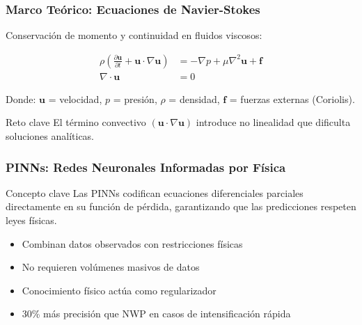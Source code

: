 \begin{frame}[fragile]
  \frametitle{Marco Teórico: Ecuaciones de Navier-Stokes}
  
  Conservación de momento y continuidad en fluidos viscosos:
  
  \begin{align*}
    \rho \left( \frac{\partial \mathbf{u}}{\partial t} + \mathbf{u} \cdot \nabla \mathbf{u} \right) &= -\nabla p + \mu \nabla^2 \mathbf{u} + \mathbf{f} \\
    \nabla \cdot \mathbf{u} &= 0
  \end{align*}
  
  Donde: $\mathbf{u}$ = velocidad, $p$ = presión, $\rho$ = densidad, $\mathbf{f}$ = fuerzas externas (Coriolis).
  
  \begin{block}{Reto clave}
    El término convectivo \textcolor{ColorRojoVino}{$(\mathbf{u} \cdot \nabla \mathbf{u})$} introduce \textcolor{ColorRojoVino}{no linealidad} que dificulta soluciones analíticas.
  \end{block}
  
\end{frame}

\begin{frame}[fragile]
  \frametitle{PINNs: Redes Neuronales Informadas por Física}
  
  \begin{block}{\textcolor{ColorVerdeOliva}{Concepto clave}}
    Las PINNs codifican ecuaciones diferenciales parciales directamente en su función de pérdida, garantizando que las predicciones respeten leyes físicas.
  \end{block}
  
  \begin{itemize}
    \item \textcolor{ColorVerdeOliva}{Combinan datos observados con restricciones físicas}
    \item \textcolor{ColorVerdeOliva}{No requieren volúmenes masivos de datos}
    \item \textcolor{ColorVerdeOliva}{Conocimiento físico actúa como regularizador}
    \item \alert{30\% más precisión que NWP} en casos de intensificación rápida
  \end{itemize}
  
\end{frame}
